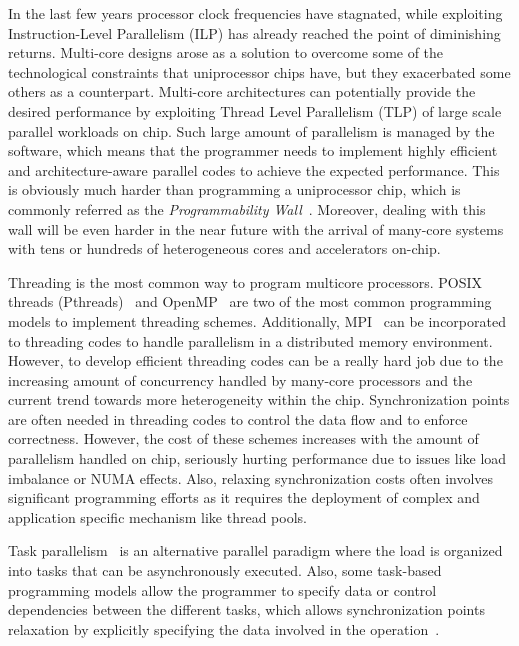 
In the last few years processor clock frequencies have stagnated, while exploiting
Instruction-Level Parallelism (ILP) has already reached the point of diminishing returns.
Multi-core designs arose as a solution to overcome some of the technological constraints
that uniprocessor chips have, but they exacerbated some others as a counterpart.
Multi-core architectures can potentially provide the desired performance by exploiting
Thread Level Parallelism (TLP) of large scale parallel workloads on chip. Such large
amount of parallelism is managed by the software, which means that the programmer needs to
implement highly efficient and architecture-aware parallel codes to achieve the expected
performance. This is obviously much harder than programming a uniprocessor chip, which is
commonly referred as the \emph{Programmability Wall}~\cite{Chapman:2007multicore}.
Moreover, dealing with this wall will be even harder in the near future with the arrival
of many-core systems with tens or hundreds of heterogeneous cores and accelerators
on-chip.

Threading is the most common way to program multicore processors. POSIX threads
(Pthreads)~\cite{Butenhof:1997:PPT:263953} and OpenMP~\cite{Chapman:2007:UOP:1370966} are
two of the most common programming models to implement threading schemes.  Additionally,
MPI~\cite{Nagle:2005:MCR:1239662.1239666} can be incorporated to threading codes to handle
parallelism in a distributed memory environment.  However, to develop efficient threading
codes can be a really hard job due to the increasing amount of concurrency handled by
many-core processors and the current trend towards more heterogeneity within the chip.
Synchronization points are often needed in threading codes to control the data flow and to
enforce correctness.  However, the cost of these schemes increases with the amount of
parallelism handled on chip, seriously hurting performance due to issues like load
imbalance or NUMA effects.  Also, relaxing synchronization costs often involves
significant programming efforts as it requires the deployment of complex and application
specific mechanism like thread pools.

Task
parallelism~\cite{Fatahalian:2006:SPM:1188455.1188543,Blumofe1995,Bellens:SC2006,Ayguade:2009:DOT:1512157.1512430,Tzenakis:2012:BBD:2370036.2145864,Jenista:2011:OSO:2038037.1941563,Planas:2009:HTP:1572226.1572233,Duran:PPL2011}
is an alternative parallel paradigm where the load is organized into tasks that can be
asynchronously executed.  Also, some task-based programming models allow the programmer to
specify data or control dependencies between the different tasks, which allows
synchronization points relaxation by explicitly specifying the data involved in the
operation~\cite{Jenista:2011:OSO:2038037.1941563,Ayguade:2009:DOT:1512157.1512430,Tzenakis:2012:BBD:2370036.2145864,Duran:PPL2011}.

